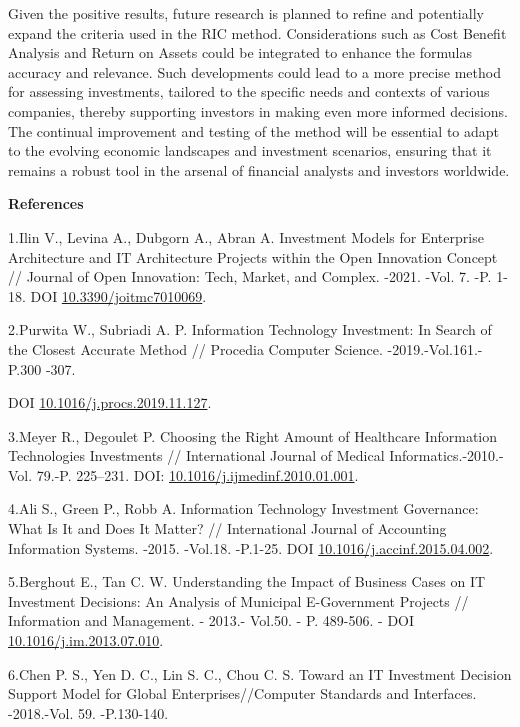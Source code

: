 \documentclass[
]{article}
\begin{document}
Given the positive results, future research is planned to refine and
potentially expand the criteria used in the RIC method. Considerations
such as Cost Benefit Analysis and Return on Assets could be integrated
to enhance the formula\textquotesingle s accuracy and relevance. Such
developments could lead to a more precise method for assessing
investments, tailored to the specific needs and contexts of various
companies, thereby supporting investors in making even more informed
decisions. The continual improvement and testing of the method will be
essential to adapt to the evolving economic landscapes and investment
scenarios, ensuring that it remains a robust tool in the arsenal of
financial analysts and investors worldwide.

\textbf{References}

1.Ilin V., Levina A., Dubgorn A., Abran A. Investment Models for
Enterprise Architecture and IT Architecture Projects within the Open
Innovation Concept // Journal of Open Innovation: Tech, Market, and
Complex. -2021. -Vol. 7. -P. 1-18. DOI
\href{https://doi.org/10.3390/joitmc7010069}{10.3390/joitmc7010069}.

2.Purwita W., Subriadi A. P. Information Technology Investment: In
Search of the Closest Accurate Method // Procedia Computer Science.
-2019.-Vol.161.-P.300 -307.

DOI
\href{https://doi.org/10.1016/j.procs.2019.11.127}{10.1016/j.procs.2019.11.127}.

3.Meyer R., Degoulet P. Choosing the Right Amount of Healthcare
Information Technologies Investments // International Journal of Medical
Informatics.-2010.- Vol. 79.-P. 225--231. DOI:
\href{https://doi.org/10.1016/j.ijmedinf.2010.01.001}{10.1016/j.ijmedinf.2010.01.001}.

4.Ali S., Green P., Robb A. Information Technology Investment
Governance: What Is It and Does It Matter? // International Journal of
Accounting Information Systems. -2015. -Vol.18. -P.1-25. DOI
\href{https://doi.org/10.1016/j.accinf.2015.04.002}{10.1016/j.accinf.2015.04.002}.

5.Berghout E., Tan C. W. Understanding the Impact of Business Cases on
IT Investment Decisions: An Analysis of Municipal E-Government Projects
// Information and Management. - 2013.- Vol.50. - P. 489-506. - DOI
\href{https://doi.org/10.1016/j.im.2013.07.010}{10.1016/j.im.2013.07.010}.

6.Chen P. S., Yen D. C., Lin S. C., Chou C. S. Toward an IT Investment
Decision Support Model for Global Enterprises//Computer Standards and
Interfaces. -2018.-Vol. 59. -P.130-140.
\end{document}

